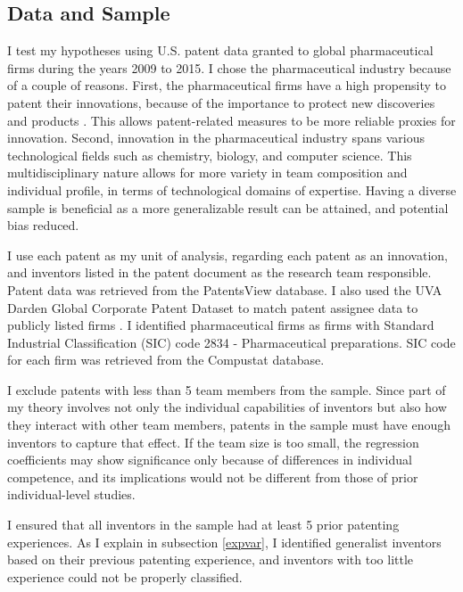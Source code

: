 \documentclass{article}
\begin{document}
\subsection{Data and Sample}
I test my hypotheses using U.S. patent data granted to global pharmaceutical firms during the years 2009 to 2015. I chose the pharmaceutical industry because of a couple of reasons. First, the pharmaceutical firms have a high propensity to patent their innovations, because of the importance to protect new discoveries and products \autocite{Fontana2013,Arundel1998}. This allows patent-related measures to be more reliable proxies for innovation. Second, innovation in the pharmaceutical industry spans various technological fields such as chemistry, biology, and computer science. This multidisciplinary nature allows for more variety in team composition and individual profile, in terms of technological domains of expertise. Having a diverse sample is beneficial as a more generalizable result can be attained, and potential bias reduced.

I use each patent as my unit of analysis, regarding each patent as an innovation, and inventors listed in the patent document as the research team responsible. Patent data was retrieved from the PatentsView database. I also used the UVA Darden Global Corporate Patent Dataset to match patent assignee data to publicly listed firms \autocite{Bena2017}. I identified pharmaceutical firms as firms with Standard Industrial Classification (SIC) code 2834 - Pharmaceutical preparations. SIC code for each firm was retrieved from the Compustat database.


I exclude patents with less than 5 team members from the sample. Since part of my theory involves not only the individual capabilities of inventors but also how they interact with other team members, patents in the sample must have enough inventors to capture that effect. If the team size is too small, the regression coefficients may show significance only because of differences in individual competence, and its implications would not be different from those of prior individual-level studies.

I ensured that all inventors in the sample had at least 5 prior patenting experiences. As I explain in subsection \ref{expvar}, I identified generalist inventors based on their previous patenting experience, and inventors with too little experience could not be properly classified.
\end{document}
